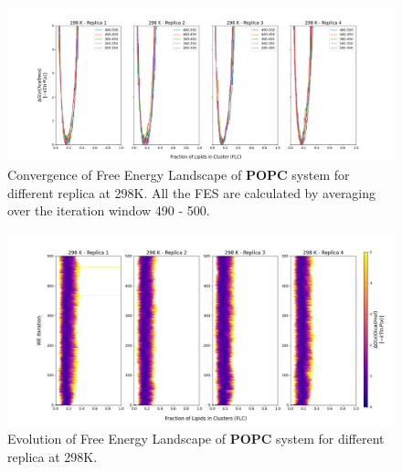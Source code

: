\documentclass{biophys-new}
\begin{document}
\begin{figure}[hbt!]
\centering
\includegraphics[width=1.1\linewidth]{all_plots/ClusterLipids2Total/DPPC_POPC_CHOL/298K/Convergence_POPC_298_ClusterLipids2Total.png}
\caption{Convergence of Free Energy Landscape of \textbf{POPC} system for different replica at 298K. All the FES are calculated by averaging over the iteration window 490 - 500.}
\label{fig:view}

\end{figure}

\begin{figure}[hbt!]
\centering
\includegraphics[width=1.1\linewidth]{all_plots/ClusterLipids2Total/DPPC_POPC_CHOL/298K/Evolution_POPC_298_ClusterLipids2Total.png}
\caption{Evolution of Free Energy Landscape of \textbf{POPC} system for different replica at 298K.}
\label{fig:view}

\end{figure}
\end{document}
